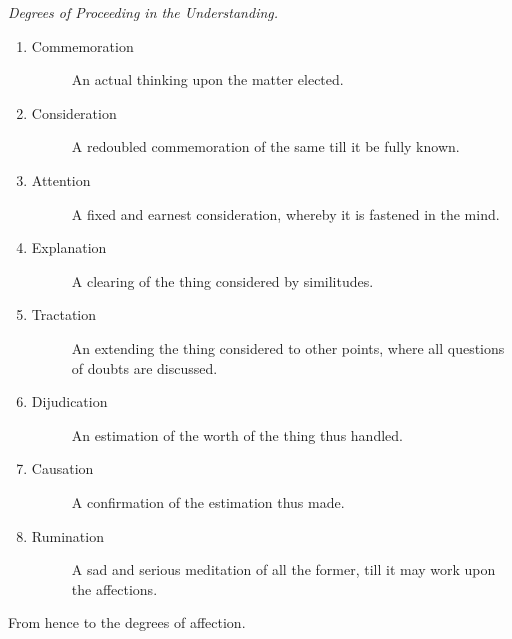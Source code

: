     \begin{center}\emph{Degrees of Proceeding in the Understanding.}\end{center} \par
    \begin{enumerate}\addtocounter{enumi}{3}
        \item \begin{description}\item[Commemoration] An actual thinking upon the matter elected.\end{description}
        \item \begin{description}\item[Consideration] A redoubled commemoration of the same till it be fully known.\end{description}
        \item \begin{description}\item[Attention] A fixed and earnest consideration, whereby it is fastened in the mind.\end{description}
        \item \begin{description}\item[Explanation] A clearing of the thing considered by similitudes.\end{description}
        \item \begin{description}\item[Tractation] An extending the thing considered to other points, where all questions of doubts are discussed.\end{description}
        \item \begin{description}\item[Dijudication] An estimation of the worth of the thing thus handled.\end{description}
        \item \begin{description}\item[Causation] A confirmation of the estimation thus made.\end{description}
        \item \begin{description}\item[Rumination] A sad and serious meditation of all the former, till it may work upon the affections.\end{description}        
    \end{enumerate}
\begin{center}From hence to the degrees of affection.\end{center}
